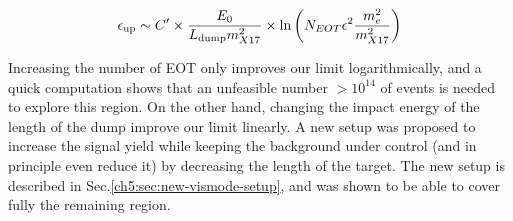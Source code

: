 \begin{equation}
  \label{eq:x17-coverage}
  \epsilon_{\textrm{up}} \sim C' \times \frac{E_0}{L_{\textrm{dump}}m^2_{X17}} \times \ln{\left(N_{EOT} \epsilon^2 \frac{m_e^2}{m_{X17}^2}\right)}
\end{equation}

Increasing the number of EOT only improves our limit logarithmically, and a quick computation shows that an unfeasible number $>10^{14}$ of events is needed to explore this region. On the other hand, changing the impact energy of the length of the dump improve our limit linearly. A new setup was proposed to increase the signal yield while keeping the background under control (and in principle even reduce it) by decreasing the length of the target. The new setup is described in Sec.\ref{ch5:sec:new-vismode-setup}, and was shown to be able to cover fully the remaining region.


